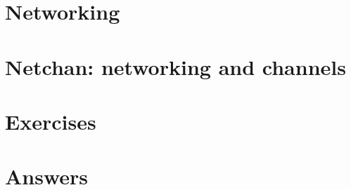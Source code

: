 \section{Networking}

\section{Netchan: networking and channels}


\section{Exercises}










\cleardoublepage
\section{Answers}
\shipoutAnswer
